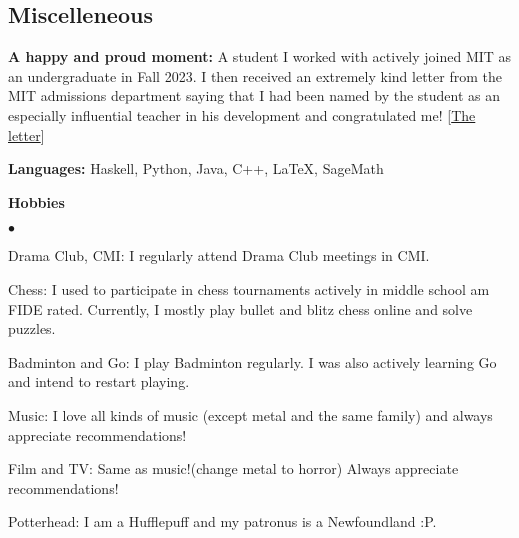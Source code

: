 \documentclass[margin,line, 10pt]{res}
\newenvironment{list2}{
  \begin{list}{$\bullet$}{%
      \setlength{\itemsep}{0in}
      \setlength{\parsep}{0in} \setlength{\parskip}{0in}
      \setlength{\topsep}{0in} \setlength{\partopsep}{0in} 
      \setlength{\leftmargin}{0.2in}}}{\end{list}}
\begin{document}
\begin{resume}
\section{\sc Miscelleneous}

{\bf A happy and proud moment:} A student I worked with actively joined MIT as an undergraduate in Fall 2023. I then received an extremely kind letter from the MIT admissions department saying that I had been named by the student as an especially influential teacher in his development and congratulated me! \hfill [\href{https://www.dropbox.com/scl/fi/3qgucmmeimm4omc644ikz/mit_atul.jpg?rlkey=mflk16ps5md13whz80o50t2yj&dl=0}{The letter}]

\vspace*{0.1mm}
{\bf Languages:} Haskell, Python, Java, C++, \LaTeX, SageMath

\vspace*{0.1mm}
{\bf Hobbies}
\begin{list2}
    \item Drama Club, CMI: I regularly attend Drama Club meetings in CMI.
    \item Chess: I used to participate in chess tournaments actively in middle school am FIDE rated. Currently, I mostly play bullet and blitz chess online and solve puzzles.
    \item Badminton and Go: I play Badminton regularly. I was also actively learning Go and intend to restart playing.
    \item Music: I love all kinds of music (except metal and the same family) and always appreciate recommendations!
    \item Film and TV: Same as music!(change metal to horror) Always appreciate recommendations!
    \item Potterhead: I am a Hufflepuff and my patronus is a Newfoundland :P.
\end{list2}



\end{resume}
\thispagestyle{lastpage}
\end{document}
